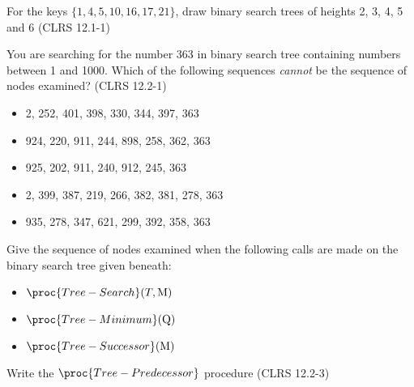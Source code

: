 \documentclass{article}
\begin{document}
\thispagestyle{fancy}

\begin{Exercise}[title={Simple training exercises}]

    \Question
    For the keys $\{ 1,4,5,10,16,17,21 \}$, draw binary search trees of heights
    2, 3, 4, 5 and 6 (CLRS 12.1-1)

    \Question
    You are searching for the number 363 in binary search tree containing
    numbers between 1 and 1000. Which of the following sequences \textit{cannot}
    be the sequence of nodes examined? (CLRS 12.2-1)

    \begin{itemize}
        \item 2, 252, 401, 398, 330, 344, 397, 363
        \item 924, 220, 911, 244, 898, 258, 362, 363
        \item 925, 202, 911, 240, 912, 245, 363
        \item 2, 399, 387, 219, 266, 382, 381, 278, 363
        \item 935, 278, 347, 621, 299, 392, 358, 363
    \end{itemize}

    \Question
    Give the sequence of nodes examined when the following calls are made on the
    binary search tree given beneath:

    \begin{minipage}{.35\textwidth}
    \begin{itemize}
        \item $\proc{Tree-Search}(T,\textrm{M})$
        \item $\proc{Tree-Minimum}(\textrm{Q})$
        \item $\proc{Tree-Successor}(\textrm{M})$
    \end{itemize}
    \end{minipage}
    \hfill
    \begin{minipage}{.6\textwidth}
        \centering
        

    \end{minipage}

    \Question
    Write the $\proc{Tree-Predecessor}$ procedure (CLRS 12.2-3)

\end{Exercise}
\end{document}
